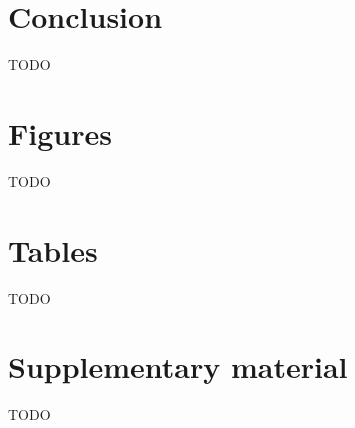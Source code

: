 \documentclass[fleqn,11pt]{wlpeerj}
\begin{document}
\section*{Conclusion}
TODO


\section*{Figures}
TODO

\section*{Tables}
TODO

\section*{Supplementary material}
TODO

\clearpage

\end{document}
